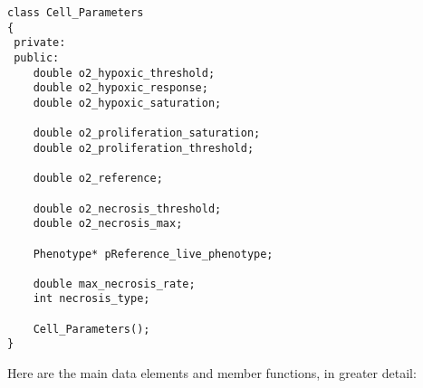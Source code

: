 \documentclass[12pt]{article}
\begin{document}
\begin{verbatim}
class Cell_Parameters
{
 private:
 public:
    double o2_hypoxic_threshold;  
    double o2_hypoxic_response;  
    double o2_hypoxic_saturation; 
    
    double o2_proliferation_saturation;  
    double o2_proliferation_threshold;  

    double o2_reference; 
    
    double o2_necrosis_threshold;  
    double o2_necrosis_max;  
    
    Phenotype* pReference_live_phenotype;  

    double max_necrosis_rate; 
    int necrosis_type;  
    
    Cell_Parameters(); 
}
\end{verbatim}

Here are the main data elements and member functions, in greater detail: 
\end{document}
